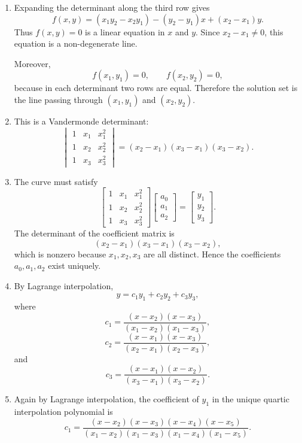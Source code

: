 \documentclass[10pt,a4paper]{article}
\begin{document}
\begin{enumerate}
  \item Expanding the determinant along the third row gives
        \[
          f(x,y)
          =
          (x_1y_2-x_2y_1)
          -(y_2-y_1)x
          +(x_2-x_1)y.
        \]
        Thus $f(x,y)=0$ is a linear equation in $x$ and $y$. Since $x_2-x_1\neq 0$, this equation is a non-degenerate line.

        Moreover,
        \[
          f(x_1,y_1)=0,
          \qquad
          f(x_2,y_2)=0,
        \]
        because in each determinant two rows are equal. Therefore the solution set is the line passing through $(x_1,y_1)$ and $(x_2,y_2)$.

  \item This is a Vandermonde determinant:
        \[
          \begin{vmatrix}
            1 & x_1 & x_1^2\\
            1 & x_2 & x_2^2\\
            1 & x_3 & x_3^2
          \end{vmatrix}
          =
          \boxed{(x_2-x_1)(x_3-x_1)(x_3-x_2).}
        \]

  \item The curve must satisfy
        \[
          \begin{bmatrix}
            1 & x_1 & x_1^2\\
            1 & x_2 & x_2^2\\
            1 & x_3 & x_3^2
          \end{bmatrix}
          \begin{bmatrix}
            a_0\\a_1\\a_2
          \end{bmatrix}
          =
          \begin{bmatrix}
            y_1\\y_2\\y_3
          \end{bmatrix}.
        \]
        The determinant of the coefficient matrix is
        \[
          (x_2-x_1)(x_3-x_1)(x_3-x_2),
        \]
        which is nonzero because $x_1,x_2,x_3$ are all distinct. Hence the coefficients $a_0,a_1,a_2$ exist uniquely.

  \item By Lagrange interpolation,
        \[
          y=c_1y_1+c_2y_2+c_3y_3,
        \]
        where
        \[
          \boxed{
          c_1=
          \frac{(x-x_2)(x-x_3)}
          {(x_1-x_2)(x_1-x_3)},}
        \]
        \[
          \boxed{
          c_2=
          \frac{(x-x_1)(x-x_3)}
          {(x_2-x_1)(x_2-x_3)},}
        \]
        and
        \[
          \boxed{
          c_3=
          \frac{(x-x_1)(x-x_2)}
          {(x_3-x_1)(x_3-x_2)}.}
        \]

  \item Again by Lagrange interpolation, the coefficient of $y_1$ in the unique quartic interpolation polynomial is
        \[
          \boxed{
          c_1=
          \frac{(x-x_2)(x-x_3)(x-x_4)(x-x_5)}
          {(x_1-x_2)(x_1-x_3)(x_1-x_4)(x_1-x_5)}.}
        \]
\end{enumerate}
\end{document}
